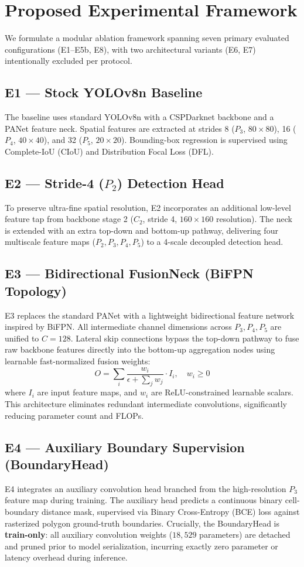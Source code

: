 \documentclass[conference]{IEEEtran}
\begin{document}
\section{Proposed Experimental Framework}
We formulate a modular ablation framework spanning seven primary evaluated configurations (E1--E5b, E8), with two architectural variants (E6, E7) intentionally excluded per protocol.

\subsection{E1 --- Stock YOLOv8n Baseline}
The baseline uses standard YOLOv8n with a CSPDarknet backbone and a PANet feature neck. Spatial features are extracted at strides 8 ($P_3$, $80 \times 80$), 16 ($P_4$, $40 \times 40$), and 32 ($P_5$, $20 \times 20$). Bounding-box regression is supervised using Complete-IoU (CIoU) and Distribution Focal Loss (DFL).

\subsection{E2 --- Stride-4 ($P_2$) Detection Head}
To preserve ultra-fine spatial resolution, E2 incorporates an additional low-level feature tap from backbone stage 2 ($C_2$, stride 4, $160 \times 160$ resolution). The neck is extended with an extra top-down and bottom-up pathway, delivering four multiscale feature maps ($P_2, P_3, P_4, P_5$) to a 4-scale decoupled detection head.

\subsection{E3 --- Bidirectional FusionNeck (BiFPN Topology)}
E3 replaces the standard PANet with a lightweight bidirectional feature network inspired by BiFPN. All intermediate channel dimensions across $P_3, P_4, P_5$ are unified to $C = 128$. Lateral skip connections bypass the top-down pathway to fuse raw backbone features directly into the bottom-up aggregation nodes using learnable fast-normalized fusion weights:
\begin{equation}
O = \sum_i \frac{w_i}{\epsilon + \sum_j w_j} \cdot I_i, \quad w_i \ge 0
\end{equation}
where $I_i$ are input feature maps, and $w_i$ are ReLU-constrained learnable scalars. This architecture eliminates redundant intermediate convolutions, significantly reducing parameter count and FLOPs.

\subsection{E4 --- Auxiliary Boundary Supervision (BoundaryHead)}
E4 integrates an auxiliary convolution head branched from the high-resolution $P_3$ feature map during training. The auxiliary head predicts a continuous binary cell-boundary distance mask, supervised via Binary Cross-Entropy (BCE) loss against rasterized polygon ground-truth boundaries. Crucially, the BoundaryHead is \textbf{train-only}: all auxiliary convolution weights ($18,529$ parameters) are detached and pruned prior to model serialization, incurring exactly zero parameter or latency overhead during inference.
\end{document}
